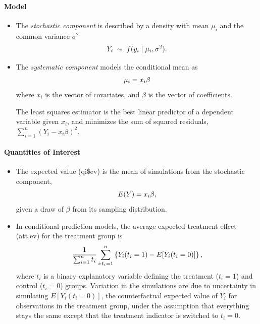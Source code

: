 \documentclass[letterpaper,10pt,english]{sphinxmanual}
\begin{document}
\paragraph{Model}
\label{zelig-ls:model}\begin{itemize}
\item {} 
The \emph{stochastic component} is described by a density with mean
\(\mu_i\) and the common variance \(\sigma^2\)
\begin{gather}
\begin{split}Y_i \; \sim \; f(y_i \mid \mu_i, \sigma^2).\end{split}\notag
\end{gather}
\item {} 
The \emph{systematic component} models the conditional mean as
\begin{gather}
\begin{split}\mu_i =  x_i \beta\end{split}\notag
\end{gather}
where \(x_i\) is the vector of covariates, and \(\beta\) is
the vector of coefficients.

The least squares estimator is the best linear predictor of a
dependent variable given \(x_i\), and minimizes the sum of
squared residuals, \(\sum_{i=1}^n (Y_i-x_i \beta)^2\).

\end{itemize}


\paragraph{Quantities of Interest}
\label{zelig-ls:quantities-of-interest}\begin{itemize}
\item {} 
The expected value (qi\$ev) is the mean of simulations from the
stochastic component,
\begin{gather}
\begin{split}E(Y) = x_i \beta,\end{split}\notag
\end{gather}
given a draw of \(\beta\) from its sampling distribution.

\item {} 
In conditional prediction models, the average expected treatment
effect (att.ev) for the treatment group is
\begin{gather}
\begin{split}\frac{1}{\sum_{i=1}^n t_i}\sum_{i:t_i=1}^n \left\{ Y_i(t_i=1) -
      E[Y_i(t_i=0)] \right\},\end{split}\notag
\end{gather}
where \(t_i\) is a binary explanatory variable defining the
treatment (\(t_i=1\)) and control (\(t_i=0\)) groups.
Variation in the simulations are due to uncertainty in simulating
\(E[Y_i(t_i=0)]\), the counterfactual expected value of
\(Y_i\) for observations in the treatment group, under the
assumption that everything stays the same except that the treatment
indicator is switched to \(t_i=0\).

\end{itemize}
\end{document}
